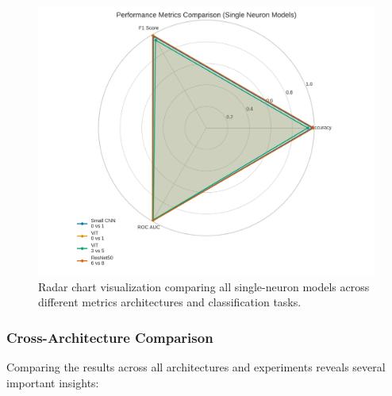 \documentclass[11pt]{article}
\begin{document}
\begin{figure}[htbp]
\centering
\includegraphics[width=\textwidth]{figures/radar_chart_comparison.png}
\caption{Radar chart visualization comparing all single-neuron models across different metrics architectures and classification tasks.}
\end{figure}

\subsubsection{Cross-Architecture Comparison}
Comparing the results across all architectures and experiments reveals several important insights:
\end{document}
